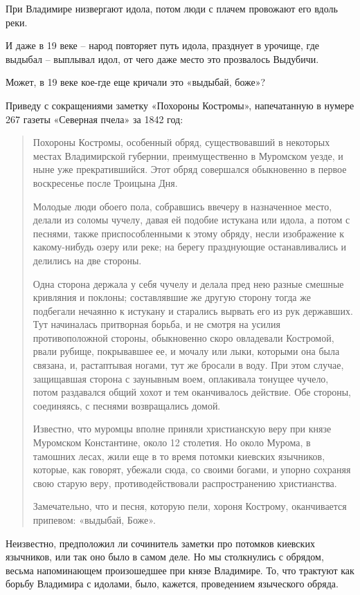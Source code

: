 \documentclass[a5paper,11pt,openany]{article}
\begin{document}
   При Владимире низвергают идола, потом люди с плачем провожают его вдоль реки.

   И даже в 19 веке – народ повторяет путь идола, празднует в урочище, где выдыбал – выплывал идол, от чего даже место это прозвалось Выдубичи.

   Может, в 19 веке кое-где еще кричали это «выдыбай, боже»?

   Приведу с сокращениями заметку «Похороны Костромы», напечатанную в нумере 267 газеты «Северная пчела» за 1842 год:

\begin{quotation}
\noindent    Похороны Костромы, особенный обряд, существовавший в некоторых местах Владимирской губернии, преимущественно в Муромском уезде, и ныне уже прекратившийся.
Этот обряд совершался обыкновенно в первое воскресенье после Троицына Дня.

   Молодые люди обоего пола, собравшись ввечеру в назначенное место, делали из соломы чучелу, давая ей подобие истукана или идола, а потом с песнями, также приспособленными к этому обряду, несли изображение к какому-нибудь озеру или реке; на берегу празднующие останавливались и делились на две стороны.

   Одна сторона держала у себя чучелу и делала пред нею разные смешные кривляния и поклоны; составлявшие же другую сторону тогда же подбегали нечаянно к истукану и старались вырвать его из рук державших. Тут начиналась притворная борьба, и не смотря на усилия противоположной стороны, обыкновенно скоро овладевали Костромой, рвали рубище, покрывавшее ее, и мочалу или лыки, которыми она была связана, и, растаптывая ногами, тут же бросали в воду. При этом случае, защищавшая сторона с  заунывным воем, оплакивала тонущее чучело, потом раздавался общий хохот и тем оканчивалось действие. Обе стороны, соединяясь, с песнями возвращались домой.

   Известно, что муромцы вполне приняли христианскую веру при князе Муромском Константине, около 12 столетия. Но около Мурома, в тамошних лесах, жили еще в то время потомки киевских язычников, которые, как говорят, убежали сюда, со своими богами, и упорно сохраняя свою старую веру, противодействовали распространению христианства.

Замечательно, что и песня, которую пели, хороня Кострому, оканчивается припевом: «выдыбай, Боже».
\end{quotation}

   Неизвестно, предположил ли сочинитель заметки про потомков киевских язычников, или так оно было в самом деле. Но мы столкнулись с обрядом, весьма напоминающем произошедшее при князе Владимире. То, что трактуют как борьбу Владимира с идолами, было, кажется, проведением языческого обряда.
\end{document}
